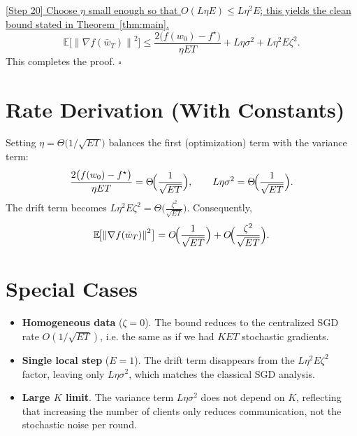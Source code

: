 \documentclass{article}
\newcommand{\E}{\mathbb{E}}
\newcommand{\norm}[1]{\left\|#1\right\|}
\begin{document}
\noindent\underline{[Step 20] Choose $\eta$ small enough so that $O(L\eta E)\le L\eta^{2}E$; this yields the clean bound stated in Theorem~\ref{thm:main}.}
\[
\E\!\bigl[\norm{\nabla f(\bar w_T)}^{2}\bigr]
\le
\frac{2\bigl(f(w_0)-f^\star\bigr)}{\eta ET}
   +L\eta\sigma^{2}
   +L\eta^{2}E\zeta^{2}.
\]
This completes the proof. \hfill $\square$

\section*{Rate Derivation (With Constants)}
Setting $\eta = \Theta\!\bigl(1/\sqrt{ET}\bigr)$ balances the first (optimization) term with the variance term:
\[
\frac{2\bigl(f(w_0)-f^\star\bigr)}{\eta ET}
   =\Theta\!\Bigl(\frac{1}{\sqrt{ET}}\Bigr),\qquad
L\eta\sigma^{2}= \Theta\!\Bigl(\frac{1}{\sqrt{ET}}\Bigr).
\]
The drift term becomes $L\eta^{2}E\zeta^{2}= \Theta\!\bigl(\frac{\zeta^{2}}{\sqrt{ET}}\bigr)$. Consequently,
\[
\E\!\bigl[\norm{\nabla f(\bar w_T)}^{2}\bigr]
= O\!\Bigl(\frac{1}{\sqrt{ET}}\Bigr)
  + O\!\Bigl(\frac{\zeta^{2}}{\sqrt{ET}}\Bigr).
\]

\section*{Special Cases}
\begin{itemize}
    \item \textbf{Homogeneous data} ($\zeta=0$). The bound reduces to the centralized SGD rate $O(1/\sqrt{ET})$, i.e. the same as if we had $K\!E\!T$ stochastic gradients.
    \item \textbf{Single local step} ($E=1$). The drift term disappears from the $L\eta^{2}E\zeta^{2}$ factor, leaving only $L\eta\sigma^{2}$, which matches the classical SGD analysis.
    \item \textbf{Large $K$ limit}. The variance term $L\eta\sigma^{2}$ does not depend on $K$, reflecting that increasing the number of clients only reduces communication, not the stochastic noise per round.
\end{itemize}
\end{document}
